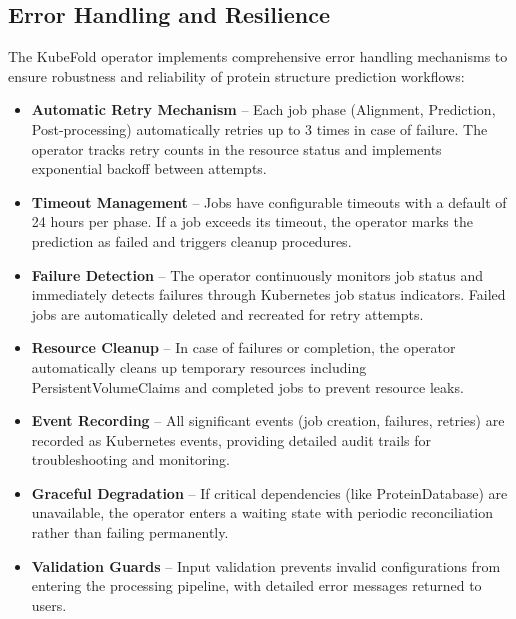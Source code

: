 \subsection{Error Handling and Resilience}

The KubeFold operator implements comprehensive error handling mechanisms to ensure robustness and reliability of protein structure prediction workflows:

\begin{itemize}
    \item \textbf{Automatic Retry Mechanism} -- Each job phase (Alignment, Prediction, Post-processing) automatically retries up to 3 times in case of failure. 
    The operator tracks retry counts in the resource status and implements exponential backoff between attempts.
    
    \item \textbf{Timeout Management} -- Jobs have configurable timeouts with a default of 24 hours per phase. 
    If a job exceeds its timeout, the operator marks the prediction as failed and triggers cleanup procedures.
    
    \item \textbf{Failure Detection} -- The operator continuously monitors job status and immediately detects failures through Kubernetes job status indicators.
    Failed jobs are automatically deleted and recreated for retry attempts.
    
    \item \textbf{Resource Cleanup} -- In case of failures or completion, the operator automatically cleans up temporary resources including PersistentVolumeClaims and completed jobs to prevent resource leaks.
    
    \item \textbf{Event Recording} -- All significant events (job creation, failures, retries) are recorded as Kubernetes events, providing detailed audit trails for troubleshooting and monitoring.
    
    \item \textbf{Graceful Degradation} -- If critical dependencies (like ProteinDatabase) are unavailable, the operator enters a waiting state with periodic reconciliation rather than failing permanently.
    
    \item \textbf{Validation Guards} -- Input validation prevents invalid configurations from entering the processing pipeline, with detailed error messages returned to users.
\end{itemize}

